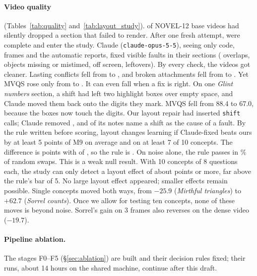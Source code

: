\paragraph{Video quality} (Tables~\ref{tab:quality} and~\ref{tab:layout_study}). \AdmIncompleteBefore{} of
\AdmTotal{} NOVEL-12 base videos had silently dropped a section that failed to render. After one fresh attempt,
\AdmComplete{} were complete and enter the study. Claude (\texttt{claude-opus-5-5}), seeing only code, frames and the
automatic reports, fixed \ClaudeFaults{} visible faults in their \ClaudeSections{} sections (\ClaudeOverlap{} overlaps,
\ClaudeOther{} objects missing or mistimed, \ClaudeOffScreen{} off screen, \ClaudeLeftover{} leftovers). By every
check, the videos got cleaner. Lasting conflicts fell from \LSOursConflicts{} to \LSClaudeConflicts{}, and broken
attachments fell from \LSOursAttach{} to \LSClaudeAttach{}. Yet MVQS rose only from \LSOursMvqs{} to
\LSClaudeMvqs{}. It can even fall when a fix is right. On one \emph{Glint numbers} section, a shift had left two
highlight boxes over empty space, and Claude moved them back onto the digits they mark. MVQS fell from 88.4 to 67.0,
because the boxes now touch the digits. Our layout repair had inserted \ShiftsIn{} \texttt{shift} calls; Claude removed \ShiftsRemoved{}, and
\ShiftNotes{} of its notes name a shift as the cause of a fault. By the rule written before scoring, layout changes
learning if Claude-fixed beats ours by at least 5 points of M9 on average and on at least 7 of 10 concepts. The
difference is \LSDiff{} points with \LSWins{} of \LSN{}, so the rule is \LSGate{}. On noise alone, the rule
passes in \NMRuleFPR\% of random swaps. This is a weak null result. With 10 concepts of 8 questions each, the study
can only detect a layout effect of about \NMLayoutMDE{} points or more, far above the rule's bar of 5. No large
layout effect appeared; smaller effects remain possible. Single concepts moved both ways, from
$-25.9$ (\emph{Mirthful triangles}) to $+62.7$ (\emph{Sorrel counts}). Once we allow for testing ten concepts, none of
these moves is beyond noise. Sorrel's gain on 3 frames also reverses on the dense video ($-19.7$).

\paragraph{Pipeline ablation.} The stages F0--F5
(\S\ref{sec:ablation}) are built and their decision rules fixed; their runs, about 14 hours on the shared machine,
continue after this draft.
